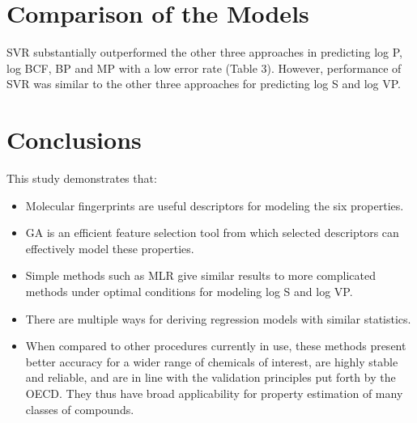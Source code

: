 \documentclass[10pt, letter]{report}
\renewcommand{\=}{\, =\, }
\newcommand{\+}{\, +\, }
\renewcommand{\-}{\, -\, }
\begin{document}
\chapter{Comparison of the Models}

SVR substantially outperformed the other three approaches in predicting log P, log
BCF, BP and MP with a low error rate (Table 3). However, performance of SVR
was similar to the other three approaches for predicting log S and log VP.

\chapter{Conclusions}

This study demonstrates that:
\begin{itemize}
\item Molecular fingerprints are useful descriptors for modeling the six properties.
\item GA is an efficient feature selection tool from which selected descriptors can
effectively model these properties.
\item Simple methods such as MLR give similar results to more complicated
methods under optimal conditions for modeling log S and log VP.
\item There are multiple ways for deriving regression models with similar statistics.
\item When compared to other procedures currently in use, these methods present better
accuracy for a wider range of chemicals of interest, are highly stable and reliable,
and are in line with the validation principles put forth by the OECD. They thus
have broad applicability for property estimation of many classes of compounds.
\end{itemize}
\end{document}

